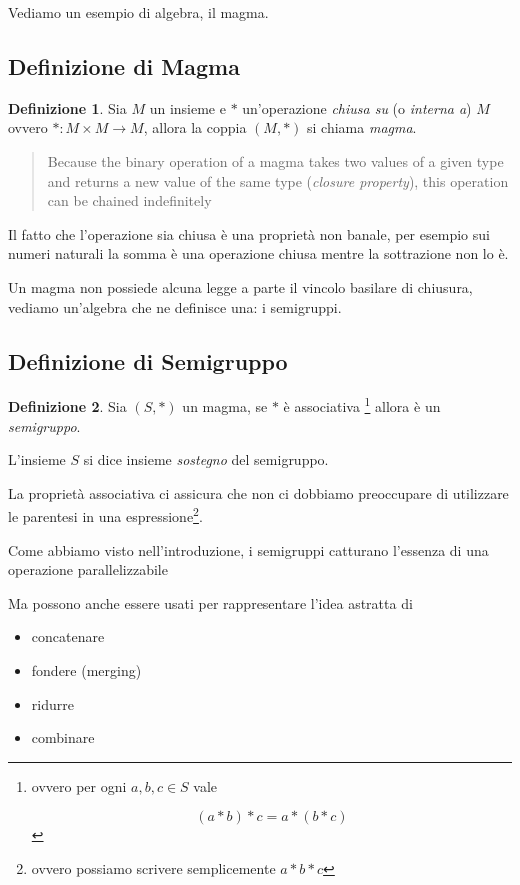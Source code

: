 \documentclass[12pt]{article}
\theoremstyle{definition}
\newtheorem{definition}{Definizione}[section]
\begin{document}
Vediamo un esempio di algebra, il magma.

\subsection{Definizione di Magma}

\begin{definition}
Sia $M$ un insieme e $*$ un'operazione \emph{chiusa su} (o \emph{interna a}) $M$ ovvero $*: M \times M \rightarrow M$,
allora la coppia $(M, *)$ si chiama \emph{magma}.
\end{definition}

\begin{quote}
Because the binary operation of a magma takes two values of a given type and returns a new value of the same type (\emph{closure property}),
this operation can be chained indefinitely
\end{quote}

Il fatto che l'operazione sia chiusa è una proprietà non banale,
per esempio sui numeri naturali la somma è una operazione chiusa mentre la sottrazione non lo è.

Un magma non possiede alcuna legge a parte il vincolo basilare di chiusura, vediamo un'algebra che ne definisce una: i semigruppi.

\subsection{Definizione di Semigruppo}

\begin{definition}
Sia $(S, *)$ un magma, se $*$ è associativa \footnote{ovvero per ogni $a, b, c \in S$ vale

$$
(a * b) * c = a * ( b * c )
$$
} allora è un \emph{semigruppo}.
\end{definition}

L'insieme $S$ si dice insieme \emph{sostegno} del semigruppo.

La proprietà associativa ci assicura che non ci dobbiamo preoccupare di utilizzare le parentesi in una espressione\footnote{ovvero possiamo scrivere semplicemente $a * b * c$}.

Come abbiamo visto nell'introduzione, i semigruppi catturano l'essenza di una operazione parallelizzabile

Ma possono anche essere usati per rappresentare l'idea astratta di

\begin{itemize}
  \item concatenare
  \item fondere (merging)
  \item ridurre
  \item combinare
\end{itemize}
\end{document}
